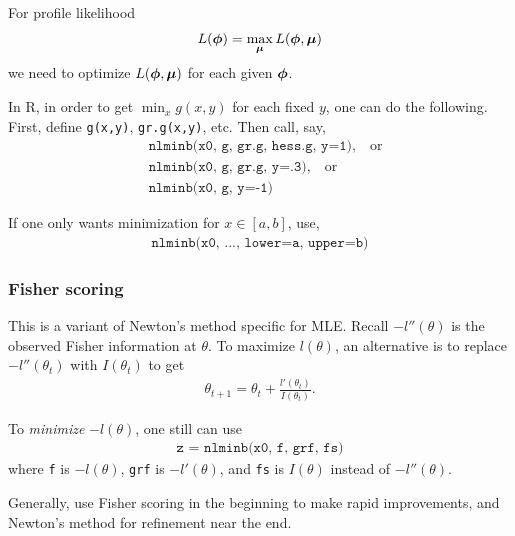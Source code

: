   \begin{frame}
  For profile likelihood
  \begin{align*}
    L(\boldsymbol{\phi}) = \max_{\boldsymbol{\mu}} L(\boldsymbol{\phi}, \boldsymbol{\mu})
  \end{align*}
  we need to optimize $L(\boldsymbol{\phi}, \boldsymbol{\mu})$ for each given $\boldsymbol{\phi}$.

  In R, in order to get $\min_x g(x,y)$ for each fixed $y$, one can do
  the following.  First, define \texttt{g(x,y)}, \texttt{gr.g(x,y)},
  etc.  Then call, say,
  \begin{align*}
    &
    \texttt{nlminb(x0, g, gr.g, hess.g, y=1)}, \quad \text{or} \\
    &
    \texttt{nlminb(x0, g, gr.g, y=.3)}, \quad \text{or} \\
    &
    \texttt{nlminb(x0, g, y=-1)}
  \end{align*}

  If one only wants minimization for $x\in [a,b]$, use,
  \begin{align*}
    \texttt{nlminb(x0, ..., lower=a, upper=b)}
  \end{align*}

  \end{frame}

  \begin{frame}
  \frametitle{Fisher scoring}
  This is a variant of Newton's method specific for MLE.
  Recall $-l''(\theta)$ is the observed
  Fisher information at $\theta$.  To maximize $l(\theta)$, an
  alternative is to replace $-l''(\theta_t)$ with $I(\theta_t)$ to get
  \begin{align*}
    \theta_{t+1} = \theta_t + \frac{l'(\theta_t)}{I(\theta_t)}.
  \end{align*}

  To \emph{minimize\/} $-l(\theta)$, one still can use
  \begin{align*}
    \texttt{z = nlminb(x0, f, grf, fs)}
  \end{align*}
  where \texttt{f} is $-l(\theta)$, \texttt{grf} is $-l'(\theta)$, and
  \texttt{fs} is $I(\theta)$ instead of $-l''(\theta)$.

  Generally, use Fisher scoring in the beginning to make rapid
  improvements, and Newton's method for refinement near the end.

  \end{frame}

